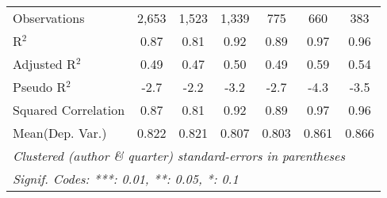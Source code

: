 \begin{tabular}{lcccccc}
   Observations                                               & 2,653   & 1,523   & 1,339         & 775           & 660     & 383\\  
   R$^2$                                                      & 0.87    & 0.81    & 0.92          & 0.89          & 0.97    & 0.96\\  
   Adjusted R$^2$                                             & 0.49    & 0.47    & 0.50          & 0.49          & 0.59    & 0.54\\  
   Pseudo R$^2$                                               & -2.7    & -2.2    & -3.2          & -2.7          & -4.3    & -3.5\\  
   Squared Correlation                                        & 0.87    & 0.81    & 0.92          & 0.89          & 0.97    & 0.96\\  
Mean(Dep. Var.) & 0.822 & 0.821 & 0.807 & 0.803 & 0.861 & 0.866 \\
   \midrule \midrule
   \multicolumn{7}{l}{\emph{Clustered (author \& quarter) standard-errors in parentheses}}\\
   \multicolumn{7}{l}{\emph{Signif. Codes: ***: 0.01, **: 0.05, *: 0.1}}\\
\end{tabular}
\par\endgroup
